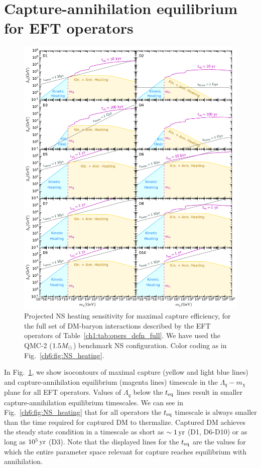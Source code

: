 \section{Capture-annihilation equilibrium for EFT operators}
\label{ch6:sec:resultsEFTop}

\begin{figure}
    \centering
    \includegraphics[width=\textwidth]{ann_heat_sensitivity.pdf}    
    \caption{Projected NS heating sensitivity for maximal capture efficiency, for the full set of DM-baryon interactions described by the EFT operators of Table~\ref{ch1:tab:opers_defn_full}. We have used the QMC-2 ($1.5M_\odot$) benchmark NS configuration.  
    Color coding as in Fig.~\ref{ch6:fig:NS_heating}. 
    }
    \label{ch6:fig:NS_heating2}
\end{figure}



In Fig.~\ref{ch6:fig:NS_heating2}, we show isocontours of maximal capture (yellow and light blue lines) and capture-annihilation equilibrium (magenta lines) timescale in the $\Lambda_q-m_\chi$ plane for all  EFT operators.  
Values of $\Lambda_q$ below the $t_{\rm eq}$ lines result in smaller capture-annihilation equilibrium timescales. 
We can see in Fig.~\ref{ch6:fig:NS_heating} that for all operators the $t_{\rm eq}$ timescale is always smaller than the time required for captured DM to thermalize. Captured DM achieves the steady state condition in a timescale as short as $\sim1{\rm \,yr}$ (D1, D6-D10) or as long as $10^5{\rm \,yr}$ (D3). 
Note that the displayed lines for the $t_{\rm eq}$ are the values for which the entire parameter space relevant for capture reaches equilibrium with annihilation. 

